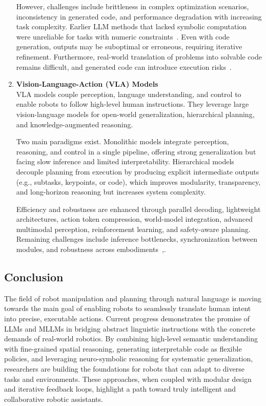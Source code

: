 \documentclass[12pt]{extarticle}
\begin{document}
\begin{enumerate}[label=\Roman*.]
However, challenges include brittleness in complex optimization scenarios, inconsistency in generated code, and performance degradation with increasing task complexity. Earlier LLM methods that lacked symbolic computation were unreliable for tasks with numeric constraints~\cite{code-as-symbolic-planner}. Even with code generation, outputs may be suboptimal or erroneous, requiring iterative refinement. Furthermore, real-world translation of problems into solvable code remains difficult, and generated code can introduce execution risks~\cite{plangenllm}.

\item \textbf{Vision-Language-Action (VLA) Models} \\
VLA models couple perception, language understanding, and control to enable robots to follow high-level human instructions. They leverage large vision-language models for open-world generalization, hierarchical planning, and knowledge-augmented reasoning.

Two main paradigms exist. Monolithic models integrate perception, reasoning, and control in a single pipeline, offering strong generalization but facing slow inference and limited interpretability. Hierarchical models decouple planning from execution by producing explicit intermediate outputs (e.g., subtasks, keypoints, or code), which improves modularity, transparency, and long-horizon reasoning but increases system complexity.

Efficiency and robustness are enhanced through parallel decoding, lightweight architectures, action token compression, world-model integration, advanced multimodal perception, reinforcement learning, and safety-aware planning. Remaining challenges include inference bottlenecks, synchronization between modules, and robustness across embodiments~\cite{vla-in-robot},\cite{vla}.

\end{enumerate}

\subsection{Conclusion}
The field of robot manipulation and planning through natural language is moving towards the main goal of enabling robots to seamlessly translate human intent into precise, executable actions. Current progress demonstrates the promise of LLMs and MLLMs in bridging abstract linguistic instructions with the concrete demands of real-world robotics. By combining high-level semantic understanding with fine-grained spatial reasoning, generating interpretable code as flexible policies, and leveraging neuro-symbolic reasoning for systematic generalization, researchers are building the foundations for robots that can adapt to diverse tasks and environments. These approaches, when coupled with modular design and iterative feedback loops, highlight a path toward truly intelligent and collaborative robotic assistants.
\end{document}
